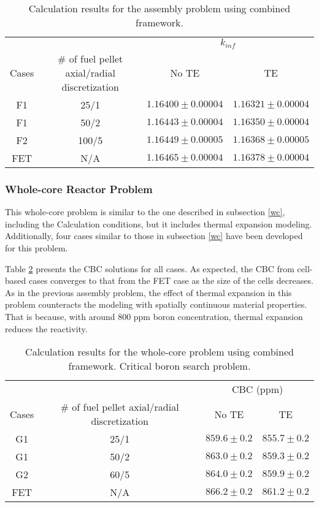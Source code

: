 \begin{table}
    \centering
    \caption{Calculation results for the assembly problem using combined framework.}
    \label{tab431} 
    \begin{tabular}{| c | c | c | c | }
    \hline 
       &   & \multicolumn{2}{c|}{$k_{inf}$}       \\
    \cline{3-4}
     Cases & \# of fuel pellet axial/radial discretization & No TE & TE \\
     \hline
     F1     & 25/1  & $1.16400\pm0.00004$ & $1.16321\pm0.00004$      \\ \hline
     F1     & 50/2  & $1.16443\pm0.00004$ & $1.16350\pm0.00004$      \\ \hline
     F2     & 100/5 & $1.16449\pm0.00005$ & $1.16368\pm0.00005$      \\ \hline
     FET    & N/A   & $1.16465\pm0.00004$ & $1.16378\pm0.00004$      \\ \hline
    \end{tabular}
\end{table}

\subsubsection{Whole-core Reactor Problem}

This whole-core problem is similar to the one described in subsection \ref{wc}, including the Calculation conditions, but it includes thermal expansion modeling. Additionally, four cases similar to those in subsection \ref{wc} have been developed for this problem.

Table \ref{tab432a} presents the CBC solutions for all cases. As expected, the CBC from cell-based cases converges to that from the FET case as the size of the cells decreases. As in the previous assembly problem, the effect of thermal expansion in this problem counteracts the modeling with spatially continuous material properties. That is because, with around 800 ppm boron concentration, thermal expansion reduces the reactivity.

\begin{table}
    \centering
    \caption[CBC results for the whole-core problem using combined framework.]{Calculation results for the whole-core problem using combined framework. Critical boron search problem.}
    \label{tab432a} 
    \begin{tabular}{| c | c | c | c | }
    \hline 
       &   & \multicolumn{2}{c|}{CBC (ppm)}       \\
    \cline{3-4}
     Cases & \# of fuel pellet axial/radial discretization & No TE & TE \\
     \hline
     G1     & 25/1  & $859.6\pm0.2$ & $855.7\pm0.2$      \\ \hline
     G1     & 50/2  & $863.0\pm0.2$ & $859.3\pm0.2$      \\ \hline
     G2     & 60/5  & $864.0\pm0.2$ & $859.9\pm0.2$      \\ \hline
     FET    & N/A   & $866.2\pm0.2$ & $861.2\pm0.2$      \\ \hline
    \end{tabular}
\end{table}

